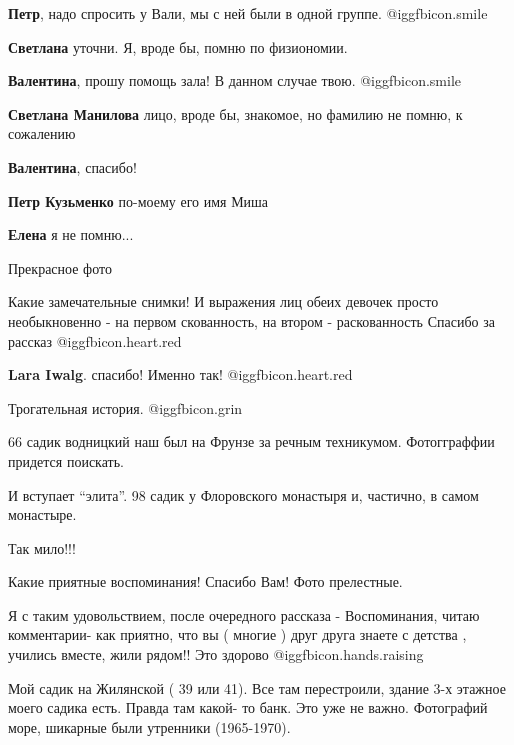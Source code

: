 \begin{itemize}
\begin{itemize} %
\textbf{Петр}, надо спросить у Вали, мы с ней были в одной группе. @igg{fbicon.smile} 

\textbf{Светлана} уточни. Я, вроде бы, помню по физиономии.

\textbf{Валентина}, прошу помощь зала! В данном случае твою. @igg{fbicon.smile} 

\textbf{Светлана Манилова} лицо, вроде бы, знакомое, но фамилию не помню, к сожалению

\textbf{Валентина}, спасибо!

\textbf{Петр Кузьменко} по-моему его имя Миша

\textbf{Елена} я не помню...
\end{itemize} %

Прекрасное фото


Какие замечательные снимки! И выражения лиц обеих девочек просто необыкновенно - на первом скованность, на втором - раскованность
Спасибо за рассказ @igg{fbicon.heart.red}

\begin{itemize} %
\textbf{Lara Iwalg}. спасибо! Именно так! @igg{fbicon.heart.red}
\end{itemize} %

Трогательная история. @igg{fbicon.grin} 

66 садик водницкий наш был на Фрунзе за речным техникумом. Фотогграффии придется поискать.


И вступает \enquote{элита}. 98 садик у Флоровского монастыря и, частично, в самом монастыре.

Так мило!!!


Какие приятные воспоминания! Спасибо Вам! Фото прелестные.

Я с таким удовольствием, после очередного рассказа - Воспоминания, читаю
комментарии- как приятно, что вы ( многие ) друг друга знаете с детства ,
учились вместе, жили рядом!! Это здорово  @igg{fbicon.hands.raising} 

Мой садик на Жилянской ( 39 или 41). Все там перестроили, здание 3-х этажное
моего садика есть. Правда там какой- то банк. Это уже не важно. Фотографий
море, шикарные были утренники (1965-1970).


\end{itemize}
